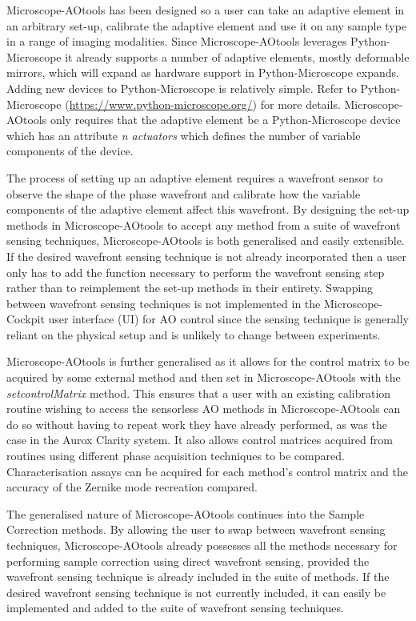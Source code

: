 Microscope-AOtools has been designed so a user can take an adaptive element 
in an arbitrary set-up, calibrate the adaptive element and use it on any 
sample type in a range of imaging modalities. Since Microscope-AOtools 
leverages Python-Microscope it already supports a number of adaptive 
elements, mostly deformable mirrors, which will expand as hardware support 
in Python-Microscope expands. Adding new devices to Python-Microscope is 
relatively simple. Refer to Python-Microscope 
(\url{https://www.python-microscope.org/}) for more details. 
Microscope-AOtools only requires that the adaptive element be a 
Python-Microscope device which has an attribute \textit{n\textunderscore 
	actuators} which defines the number of variable components of the device.

The process of setting up an adaptive element requires a wavefront sensor 
to observe the shape of the phase wavefront and calibrate how the variable 
components of the adaptive element affect this wavefront. By designing the 
set-up methods in Microscope-AOtools to accept any method from a suite of 
wavefront sensing techniques, Microscope-AOtools is both generalised and 
easily extensible. If the desired wavefront sensing technique is not 
already incorporated then a user only has to add the function necessary to 
perform the wavefront sensing step rather than to reimplement the set-up 
methods in their entirety. Swapping between wavefront sensing techniques is 
not implemented in the Microscope-Cockpit user interface (UI) for AO control since the 
sensing technique is generally reliant on the physical setup and is 
unlikely to change between experiments.

Microscope-AOtools is further generalised as it allows for the control 
matrix to be acquired by some external method and then set in 
Microscope-AOtools with the \textit{set\textunderscore controlMatrix} 
method. This ensures that a user with an existing calibration routine 
wishing to access the sensorless AO methods in Microscope-AOtools can do so 
without having to repeat work they have already performed, as was the case in 
the Aurox Clarity system. It also allows control matrices acquired from 
routines using different phase acquisition techniques to be compared. 
Characterisation assays can be acquired for each method's control matrix and 
the accuracy of the Zernike mode recreation compared.

The generalised nature of Microscope-AOtools continues into the Sample 
Correction methods. By allowing the user to swap between wavefront sensing 
techniques, Microscope-AOtools already possesses all the methods necessary 
for performing sample correction using direct wavefront sensing, provided 
the wavefront sensing technique is already included in the suite of 
methods. If the desired wavefront sensing technique is not currently included, 
it can easily be implemented and added  to the suite of wavefront sensing 
techniques. 

